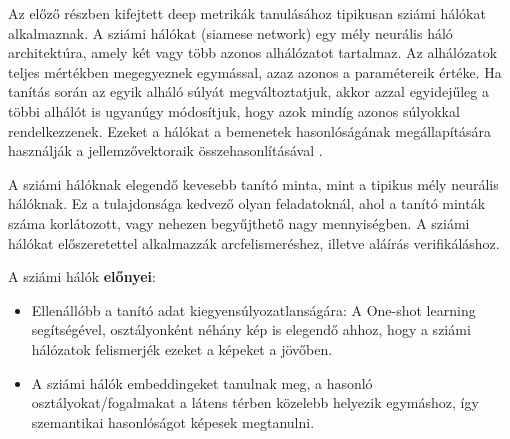 Az előző részben kifejtett deep metrikák tanulásához tipikusan sziámi hálókat alkalmaznak. A sziámi hálókat (siamese network) egy mély neurális háló architektúra, amely két vagy több azonos alhálózatot tartalmaz. Az alhálózatok teljes mértékben megegyeznek egymással, azaz azonos a paramétereik értéke. Ha tanítás során az egyik alháló súlyát megváltoztatjuk, akkor azzal egyidejűleg a többi alhálót is ugyanúgy módosítjuk, hogy azok mindíg azonos súlyokkal rendelkezzenek. Ezeket a hálókat a bemenetek hasonlóságának megállapítására használják a jellemzővektoraik összehasonlításával \cite{bromley1993siamese}. 

A sziámi hálóknak elegendő kevesebb tanító minta, mint a tipikus mély neurális hálóknak. Ez a tulajdonsága kedvező olyan feladatoknál, ahol a tanító minták száma korlátozott, vagy nehezen begyűjthető nagy mennyiségben. A sziámi hálókat előszeretettel alkalmazzák arcfelismeréshez, illetve aláírás verifikáláshoz.

A sziámi hálók \textbf{előnyei}:
\begin{itemize}
	\item Ellenállóbb a tanító adat kiegyensúlyozatlanságára: A One-shot learning segítségével, osztályonként néhány kép is elegendő ahhoz, hogy a sziámi hálózatok felismerjék ezeket a képeket a jövőben.
	\item A sziámi hálók embeddingeket tanulnak meg, a hasonló osztályokat/fogalmakat a látens térben közelebb helyezik egymáshoz, így szemantikai hasonlóságot képesek megtanulni.
\end{itemize}





